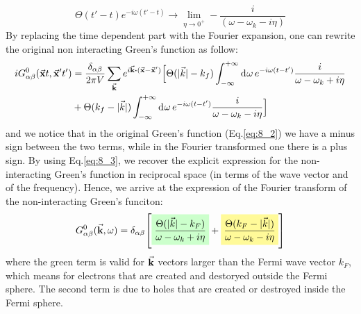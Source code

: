 \documentclass[../main/main.tex]{subfiles}
\begin{document}
\begin{equation*}
  \Theta(t'-t) e^{-i \omega (t'-t) } \longrightarrow  \lim_{\eta  \rightarrow  0^+} -  \frac{i}{(\omega - \omega _k - i \eta )}
\end{equation*}
By replacing the time dependent part with the Fourier expansion, one can rewrite the original non interacting Green's function as follow:
\begin{equation*}
\begin{split}
i G_{\alpha \beta }^0 (\va{x}t,\va{x}'t')  &= \frac{\delta _{\alpha \beta }}{2 \pi V} \sum_{\va{k}}^{} e^{i \va{k} \vdot (\va{x}-\va{x}')}
\Big[\Theta (\absvec{k} -k_f) \int_{- \infty }^{+ \infty } \dd[]{\omega } e^{- i \omega (t-t')} \frac{i}{\omega - \omega _k + i \eta } \\
& + \Theta (k_f-\absvec{k}) \int_{- \infty }^{+ \infty } \dd[]{\omega } e^{- i \omega (t-t')} \frac{i}{\omega - \omega _k - i \eta }  \Big]
\end{split}
\end{equation*}
and we notice that in the original Green's function (Eq.\eqref{eq:8_2}) we have a minus sign between the two terms, while in the Fourier transformed one there is a plus sign.
By using Eq.\eqref{eq:8_3}, we recover the explicit expression for the non-interacting Green's function in reciprocal space (in terms of the wave vector and of the frequency). Hence, we arrive at the expression of the Fourier transform of the non-interacting Green's funciton:
\begin{equation}
  G^0_{\alpha \beta } (\va{k}, \omega ) = \delta _{\alpha \beta } \qty[ \mathcolorbox{green!20}{\frac{\Theta (\absvec{k} - k_F )}{\omega - \omega _k + i \eta }}
  + \mathcolorbox{yellow!40}{\frac{\Theta ( k_F - \absvec{k} )}{\omega - \omega _k - i \eta }}]
  \label{eq:9_1}
\end{equation}
where the green term is valid for \( \va{k} \) vectors larger than the Fermi wave vector \( k_F \), which means for electrons that are created and destoryed outside the Fermi sphere. The second term is due to holes that are created or destroyed inside the Fermi sphere.
\end{document}
